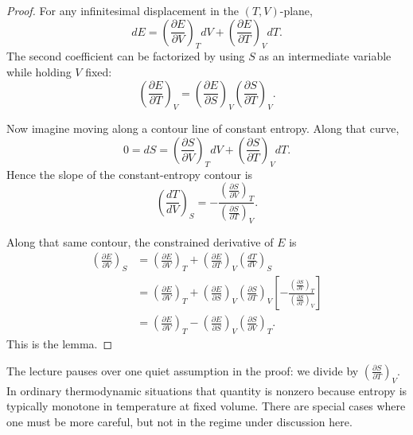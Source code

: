 \begin{proof}
For any infinitesimal displacement in the \((T,V)\)-plane,
\begin{equation}
dE
=
\left(\frac{\partial E}{\partial V}\right)_T dV
+
\left(\frac{\partial E}{\partial T}\right)_V dT.
\end{equation}
The second coefficient can be factorized by using \(S\) as an intermediate variable while holding \(V\) fixed:
\begin{equation}
\left(\frac{\partial E}{\partial T}\right)_V
=
\left(\frac{\partial E}{\partial S}\right)_V
\left(\frac{\partial S}{\partial T}\right)_V.
\end{equation}

Now imagine moving along a contour line of constant entropy. Along that curve,
\begin{equation}
0=dS=
\left(\frac{\partial S}{\partial V}\right)_T dV
+
\left(\frac{\partial S}{\partial T}\right)_V dT.
\end{equation}
Hence the slope of the constant-entropy contour is
\begin{equation}
\left(\frac{dT}{dV}\right)_S
=
-
\frac{\left(\frac{\partial S}{\partial V}\right)_T}
{\left(\frac{\partial S}{\partial T}\right)_V}.
\end{equation}

Along that same contour, the constrained derivative of \(E\) is
\begin{align}
\left(\frac{\partial E}{\partial V}\right)_S
&=
\left(\frac{\partial E}{\partial V}\right)_T
+
\left(\frac{\partial E}{\partial T}\right)_V
\left(\frac{dT}{dV}\right)_S \\
&=
\left(\frac{\partial E}{\partial V}\right)_T
+
\left(\frac{\partial E}{\partial S}\right)_V
\left(\frac{\partial S}{\partial T}\right)_V
\left[
-
\frac{\left(\frac{\partial S}{\partial V}\right)_T}
{\left(\frac{\partial S}{\partial T}\right)_V}
\right] \\
&=
\left(\frac{\partial E}{\partial V}\right)_T
-
\left(\frac{\partial E}{\partial S}\right)_V
\left(\frac{\partial S}{\partial V}\right)_T.
\end{align}
This is the lemma.
\end{proof}

\begin{remark}
The lecture pauses over one quiet assumption in the proof: we divide by \(\left(\frac{\partial S}{\partial T}\right)_V\). In ordinary thermodynamic situations that quantity is nonzero because entropy is typically monotone in temperature at fixed volume. There are special cases where one must be more careful, but not in the regime under discussion here.
\end{remark}

